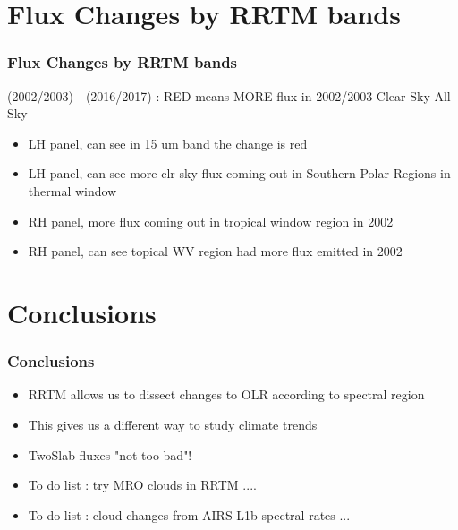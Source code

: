 \documentclass[10pt,t]{beamer}
\begin{document}
\section{Flux Changes by RRTM bands}
\begin{frame}
  \frametitle{Flux Changes by RRTM bands}
  (2002/2003) - (2016/2017) : RED means MORE flux in 2002/2003 \newline
  \hspace{0.50in} Clear Sky  \hspace{1.75in} All Sky \\
  \begin{center}
  \end{center}

  \begin{small}
    \begin{itemize}
    \item LH panel, can see in 15 um band the change is red
    \item LH panel, can see more clr sky flux coming out in Southern Polar Regions in thermal window
    \item RH panel, more flux coming out in tropical window region in 2002
    \item RH panel, can see topical WV region had more flux emitted in 2002
    \end{itemize}
  \end{small}
\end{frame}
\section{Conclusions}
\begin{frame}
  \frametitle{Conclusions}
  \begin{itemize}
  \item RRTM allows us to dissect changes to OLR according to spectral region
  \item This gives us a different way to study climate trends
  \item TwoSlab fluxes "not too bad"!
  \item To do list : try MRO clouds in RRTM ....
  \item To do list : cloud changes from AIRS L1b spectral rates ...
  \end{itemize}
\end{frame}
\end{document}
